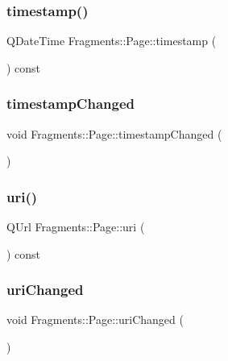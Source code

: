 \subsubsection{\texorpdfstring{timestamp()}{timestamp()}}
{\footnotesize\ttfamily Q\+Date\+Time Fragments\+::\+Page\+::timestamp (\begin{DoxyParamCaption}{ }\end{DoxyParamCaption}) const}

\mbox{\label{classFragments_1_1Page_acfdd19abc8342361f975b4d9d10e2e64}} 
\subsubsection{\texorpdfstring{timestamp\+Changed}{timestampChanged}}
{\footnotesize\ttfamily void Fragments\+::\+Page\+::timestamp\+Changed (\begin{DoxyParamCaption}{ }\end{DoxyParamCaption})\hspace{0.3cm}{\ttfamily [signal]}}

\mbox{\label{classFragments_1_1Page_a1185c1fb78c1d28eee03dba926fefcb8}} 
\subsubsection{\texorpdfstring{uri()}{uri()}}
{\footnotesize\ttfamily Q\+Url Fragments\+::\+Page\+::uri (\begin{DoxyParamCaption}{ }\end{DoxyParamCaption}) const}

\mbox{\label{classFragments_1_1Page_a03f40d5c9520331432c9f1c7ab9f805c}} 
\subsubsection{\texorpdfstring{uri\+Changed}{uriChanged}}
{\footnotesize\ttfamily void Fragments\+::\+Page\+::uri\+Changed (\begin{DoxyParamCaption}{ }\end{DoxyParamCaption})\hspace{0.3cm}{\ttfamily [signal]}}



